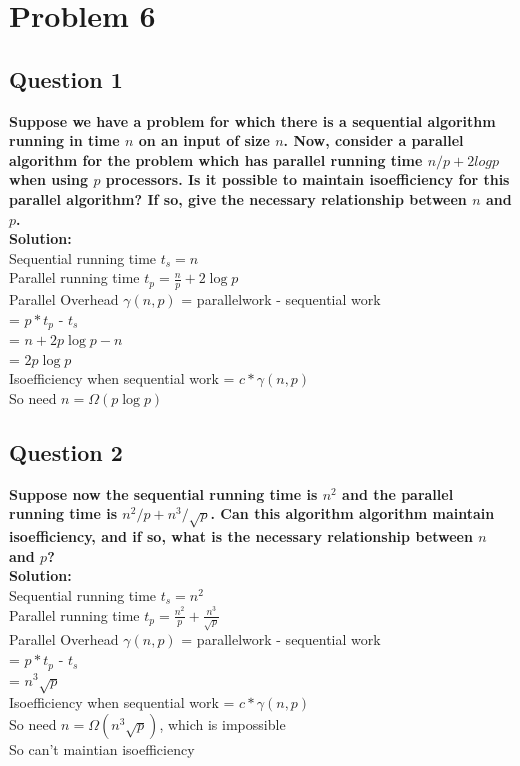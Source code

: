 \documentclass{article}
\begin{document}
\section{Problem 6}
\subsection{Question 1}
\textcolor[rgb]{0,0,1}{\textbf{Suppose we have a problem for which there is a sequential algorithm running in time $n$ on an input of size $n$. Now, consider a parallel algorithm for the problem which has parallel running time $n/p + 2log p$ when using $p$ processors. Is it possible to maintain isoefficiency for this parallel algorithm? If so, give the necessary relationship between $n$ and $p$. }}\\
\textbf{Solution: }\\
\textcolor[rgb]{1,0,0}{Sequential running time $t_{s}=n$\\
Parallel running time $t_{p}=\frac{n}{p}+2\log p$\\
Parallel Overhead $\gamma(n,p)$ = parallelwork - sequential work\\
= $p*t_{p}$ - $t_{s}$\\
= $n + 2p\log p - n$\\
= $2p\log p$\\
Isoefficiency when sequential work = $c*\gamma (n,p)$\\
So need $n = \Omega(p\log p)$}

\subsection{Question 2}
\textcolor[rgb]{0,0,1}{\textbf{Suppose now the sequential running time is $n^2$ and the parallel running time is $n^2/p + n^3/\sqrt{p}$. Can this algorithm algorithm maintain 
isoefficiency, and if so, what is the necessary relationship between $n$ and $p$?}}\\
\textbf{Solution: }\\
\textcolor[rgb]{1,0,0}{Sequential running time $t_{s}=n^2$\\
Parallel running time $t_{p}=\frac{n^2}{p}+\frac{n^3}{\sqrt{p}}$\\
Parallel Overhead $\gamma(n,p)$ = parallelwork - sequential work\\
= $p*t_{p}$ - $t_{s}$\\
= $n^3\sqrt{p}$\\
Isoefficiency when sequential work = $c*\gamma (n,p)$\\
So need $n = \Omega(n^3\sqrt{p})$, which is impossible\\
So can't maintian isoefficiency}
\end{document}
